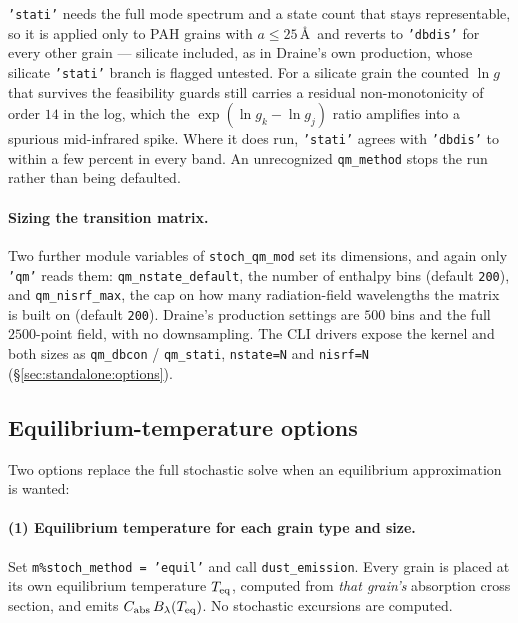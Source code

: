 \documentclass{my_memo}
\newcommand{\code}[1]{\texttt{#1}}
\newcommand{\Teq}{\ensuremath{T_{\rm eq}}}
\begin{document}
\code{'stati'} needs the full mode spectrum and a state count that stays
representable, so it is applied only to PAH grains with $a \le 25$\,\AA\ and
reverts to \code{'dbdis'} for every other grain --- silicate included, as in
Draine's own production, whose silicate \code{'stati'} branch is flagged
untested. For a silicate grain the counted $\ln g$ that survives the
feasibility guards still carries a residual non-monotonicity of order $14$ in
the log, which the $\exp(\ln g_k - \ln g_j)$ ratio amplifies into a spurious
mid-infrared spike. Where it does run, \code{'stati'} agrees with
\code{'dbdis'} to within a few percent in every band. An unrecognized
\code{qm\_method} stops the run rather than being defaulted.

\paragraph{Sizing the transition matrix.} Two further module variables of
\code{stoch\_qm\_mod} set its dimensions, and again only \code{'qm'} reads
them: \code{qm\_nstate\_default}, the number of enthalpy bins (default
\code{200}), and \code{qm\_nisrf\_max}, the cap on how many radiation-field
wavelengths the matrix is built on (default \code{200}). Draine's production
settings are $500$ bins and the full $2500$-point field, with no downsampling.
The CLI drivers expose the kernel and both sizes as \code{qm\_dbcon} /
\code{qm\_stati}, \code{nstate=N} and \code{nisrf=N}
(\S\ref{sec:standalone:options}).

\subsection{Equilibrium-temperature options}\label{sec:eqtemp}

Two options replace the full stochastic solve when an equilibrium approximation
is wanted:

\paragraph{(1) Equilibrium temperature for each grain type and size.}
Set \code{m\%stoch\_method = 'equil'} and call \code{dust\_emission}. Every grain
is placed at its own equilibrium temperature \Teq, computed from \emph{that
grain's} absorption cross section, and emits $C_{\rm abs}\,B_\lambda(\Teq)$. No
stochastic excursions are computed.
\end{document}
